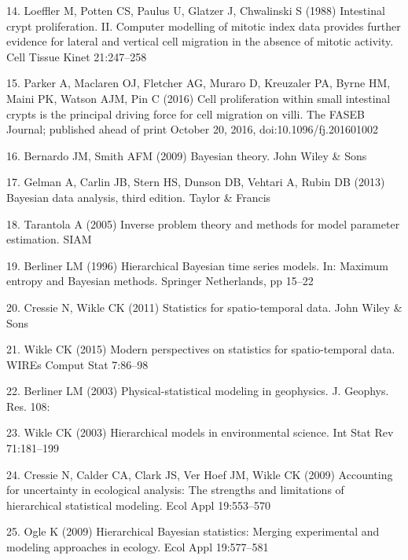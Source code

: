\documentclass[10pt,letterpaper]{article}
\begin{document}
\hypertarget{ref-Loeffler1988-zb}{}
14. Loeffler M, Potten CS, Paulus U, Glatzer J, Chwalinski S (1988)
Intestinal crypt proliferation. II. Computer modelling of mitotic index
data provides further evidence for lateral and vertical cell migration
in the absence of mitotic activity. Cell Tissue Kinet 21:247--258

\hypertarget{ref-Parker2016-jf}{}
15. Parker A, Maclaren OJ, Fletcher AG, Muraro D, Kreuzaler PA, Byrne
HM, Maini PK, Watson AJM, Pin C (2016) Cell proliferation within small
intestinal crypts is the principal driving force for cell migration on
villi. The FASEB Journal; published ahead of print October 20, 2016,
doi:10.1096/fj.201601002

\hypertarget{ref-Bernardo2009-uw}{}
16. Bernardo JM, Smith AFM (2009) Bayesian theory. John Wiley \& Sons

\hypertarget{ref-Gelman2013-id}{}
17. Gelman A, Carlin JB, Stern HS, Dunson DB, Vehtari A, Rubin DB (2013)
Bayesian data analysis, third edition. Taylor \& Francis

\hypertarget{ref-Tarantola2005-sv}{}
18. Tarantola A (2005) Inverse problem theory and methods for model
parameter estimation. SIAM

\hypertarget{ref-Berliner1996-xr}{}
19. Berliner LM (1996) Hierarchical Bayesian time series models. In:
Maximum entropy and Bayesian methods. Springer Netherlands, pp 15--22

\hypertarget{ref-Cressie2011-sw}{}
20. Cressie N, Wikle CK (2011) Statistics for spatio-temporal data. John
Wiley \& Sons

\hypertarget{ref-Wikle2015-jq}{}
21. Wikle CK (2015) Modern perspectives on statistics for
spatio-temporal data. WIREs Comput Stat 7:86--98

\hypertarget{ref-Berliner2003-yl}{}
22. Berliner LM (2003) Physical-statistical modeling in geophysics. J.
Geophys. Res. 108:

\hypertarget{ref-Wikle2003-je}{}
23. Wikle CK (2003) Hierarchical models in environmental science. Int
Stat Rev 71:181--199

\hypertarget{ref-Cressie2009-wy}{}
24. Cressie N, Calder CA, Clark JS, Ver Hoef JM, Wikle CK (2009)
Accounting for uncertainty in ecological analysis: The strengths and
limitations of hierarchical statistical modeling. Ecol Appl 19:553--570

\hypertarget{ref-Ogle2009-cb}{}
25. Ogle K (2009) Hierarchical Bayesian statistics: Merging experimental
and modeling approaches in ecology. Ecol Appl 19:577--581
\end{document}
